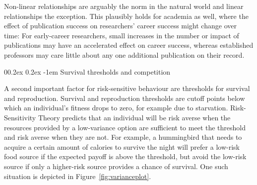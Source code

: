 \documentclass[british,,man,floatsintext]{apa6}
\makeatletter
\renewcommand{\paragraph}{\@startsection{paragraph}{4}{\parindent}%
  {0\baselineskip \@plus 0.2ex \@minus 0.2ex}%
  {-1em}%
  {\normalfont\normalsize\bfseries\itshape\typesectitle}}
\makeatother
\begin{document}
Non-linear relationships are arguably the norm in the natural world and linear relationships the exception.
This plausibly holds for academia as well, where the effect of publication success on researchers' career success might change over time:
For early-career researchers, small increases in the number or impact of publications may have an accelerated effect on career success, whereas established professors may care little about any one additional publication on their record.

\hypertarget{survival-thresholds-and-competition}{%
\paragraph{Survival thresholds and competition}\label{survival-thresholds-and-competition}}

A second important factor for risk-sensitive behaviour are thresholds for survival and reproduction.
Survival and reproduction thresholds are cutoff points below which an individual's fitness drops to zero, for example due to starvation.
Risk-Sensitivity Theory predicts that an individual will be risk averse when the resources provided by a low-variance option are sufficient to meet the threshold and risk averse when they are not.
For example, a hummingbird that needs to acquire a certain amount of calories to survive the night will prefer a low-risk food source if the expected payoff is above the threshold, but avoid the low-risk source if only a higher-risk source provides a chance of survival.
One such situation is depicted in Figure~\ref{fig:varianceplot}.
\end{document}

